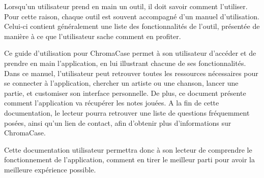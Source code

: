 Lorsqu’un utilisateur prend en main un outil, il doit savoir comment l’utiliser. Pour cette raison, chaque outil est souvent accompagné d’un manuel d’utilisation. Celui-ci contient généralement une liste des fonctionnalités de l’outil, présentée de manière à ce que l’utilisateur sache comment en profiter.

Ce guide d’utilisation pour ChromaCase permet à son utilisateur d’accéder et de prendre en main l’application, en lui illustrant chacune de ses fonctionnalités.
Dans ce manuel, l’utilisateur peut retrouver toutes les ressources nécessaires pour se connecter à l’application, chercher un artiste ou une chanson, lancer une partie, et customiser son interface personnelle. De plus, ce document présente comment l’application va récupérer les notes jouées. A la fin de cette documentation, le lecteur pourra retrouver une liste de questions fréquemment posées, ainsi qu’un lien de contact, afin d’obtenir plus d'informations sur ChromaCase.

Cette documentation utilisateur permettra donc à son lecteur de comprendre le fonctionnement de l’application, comment en tirer le meilleur parti pour avoir la meilleure expérience possible.
